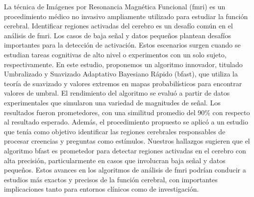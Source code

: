 La técnica de Imágenes por Resonancia Magnética Funcional (\acrshort{fmri}) es un procedimiento médico no invasivo ampliamente utilizado para estudiar la función cerebral. Identificar regiones activadas del cerebro es un desafío común en el análisis de \acrshort{fmri}. Los casos de baja señal y datos pequeños plantean desafíos importantes para la detección de activación. Estos escenarios surgen cuando se estudian tareas cognitivas de alto nivel o experimentos con un solo sujeto, respectivamente. En este estudio, proponemos un algoritmo innovador, titulado Umbralizado y Suavizado Adaptativo Bayesiano Rápido (\acrshort{bfast}), que utiliza la teoría de suavizado y valores extremos en mapas probabilísticos para encontrar valores de umbral. El rendimiento del algoritmo se evaluó a partir de datos experimentales que simularon una variedad de magnitudes de señal. Los resultados fueron prometedores, con una similitud promedio del 90\% con respecto al resultado esperado. Además, el procedimiento propuesto se aplicó a un estudio que tenía como objetivo identificar las regiones cerebrales responsables de procesar creencias y preguntas como estímulos. Nuestros hallazgos sugieren que el algoritmo \acrshort{bfast} es prometedor para detectar regiones activadas en el cerebro con alta precisión, particularmente en casos que involucran baja señal y datos pequeños. Estos avances en los algoritmos de análisis de \acrshort{fmri} podrían conducir a estudios más exactos y precisos de la función cerebral, con importantes implicaciones tanto para entornos clínicos como de investigación.